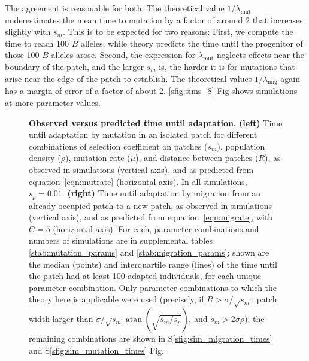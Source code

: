 \documentclass[10pt,letterpaper]{article}
\DeclareMathOperator{\atan}{atan}
\newcommand{\migrate}{\lambda_\text{mig}}
\newcommand{\mutrate}{\lambda_\text{mut}}
\begin{document}
The agreement is reasonable for both.
The theoretical value $1/\mutrate$ underestimates the mean time to mutation
by a factor of around 2 that increases slightly with $s_m$.
This is to be expected for two reasons:
First, we compute the time to reach 100 $B$ alleles, while theory predicts
the time until the progenitor of those 100 $B$ alleles arose.
Second, the expression for $\mutrate$ neglects effects near the boundary of the patch,
and the larger $s_m$ is, 
the harder it is for mutations that arise near the edge of the patch to establish.
The theoretical values $1/\migrate$ again has a margin of error of a factor of about 2.
\ref{sfig:sims_8} Fig shows simulations at more parameter values.


\begin{figure}[ht!]
  \begin{center}
  \end{center}
  \caption{
      \textbf{Observed versus predicted time until adaptation.}
      \textbf{(left)} 
      Time until adaptation by mutation in an isolated patch for different combinations
      of selection coefficient on patches ($s_m$), 
      population density ($\rho$),
      mutation rate ($\mu$),
      and distance between patches ($R$),
      as observed in simulations (vertical axis),
      and as predicted from equation~\eqref{eqn:mutrate} (horizontal axis).
      In all simulations, $s_p=0.01$.
      \textbf{(right)} 
      Time until adaptation by migration from an already occupied patch to a new patch,
      as observed in simulations (vertical axis),
      and as predicted from equation~\eqref{eqn:migrate}, with $C=5$ (horizontal axis).
      For each,
      parameter combinations and numbers of simulations are in supplemental tables \ref{stab:mutation_params} and \ref{stab:migration_params};
      shown are the median (points) and interquartile range (lines)
      of the time until the patch had at least 100 adapted individuals,
      for each unique parameter combination.
      Only parameter combinations to which the theory here is applicable were used
      (precisely, if
      $R > \sigma/\sqrt{s_m}$, 
      patch width larger than $\sigma/\sqrt{s_m} \atan(\sqrt{s_m/s_p})$, 
      and $s_m > 2 \sigma \rho$);
      the remaining combinations are shown in 
      S\ref{sfig:sim_migration_times} and S\ref{sfig:sim_mutation_times} Fig.
  }   \label{fig:sim_times}
\end{figure}
\end{document}

